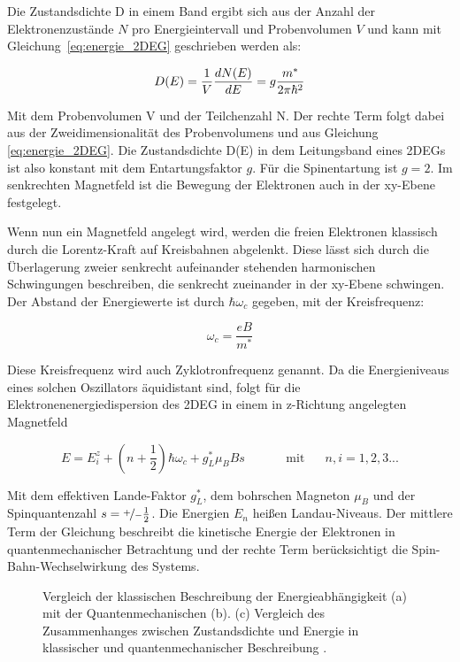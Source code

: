 Die Zustandsdichte D in einem Band ergibt sich aus der Anzahl der Elektronenzustände $N$ pro Energieintervall und Probenvolumen $V$ und kann mit Gleichung~\eqref{eq:energie_2DEG} geschrieben werden als:

\begin{equation}
	D(E)=\frac{1}{V}\frac{d N(E)}{d E}=g\frac{m^*}{2\pi\hbar^2}
	\label{eq:2DEG_zustandsdich} 
\end{equation}

Mit dem Probenvolumen V und der Teilchenzahl N. Der rechte Term folgt dabei aus der Zweidimensionalität des Probenvolumens und aus Gleichung \ref{eq:energie_2DEG}.
Die Zustandsdichte D(E) in dem Leitungsband eines 2DEGs ist also konstant mit dem Entartungsfaktor $g$. Für die Spinentartung ist $g=2$. Im senkrechten Magnetfeld ist die Bewegung der Elektronen auch in der xy-Ebene festgelegt.

Wenn nun ein Magnetfeld angelegt wird, werden die freien Elektronen klassisch durch die Lorentz-Kraft auf Kreisbahnen abgelenkt. Diese lässt sich durch die Überlagerung zweier senkrecht aufeinander stehenden harmonischen Schwingungen beschreiben, die senkrecht zueinander in der xy-Ebene schwingen. Der Abstand der Energiewerte ist durch $\hbar \omega_c$ gegeben,
mit der Kreisfrequenz:

\begin{equation}
\omega_c=\frac{eB}{m^*}
\label{eq:kreisfrequenz}
\end{equation}

Diese Kreisfrequenz wird auch Zyklotronfrequenz genannt. Da die Energieniveaus eines solchen Oszillators äquidistant sind, folgt für die Elektronenenergiedispersion des 2DEG in einem in z-Richtung angelegten Magnetfeld

\begin{equation}
E=E_i^z +(n+\frac{1}{2})\hbar\omega_c +g_L^*\mu_B Bs \text{~~~~~~~~~~mit~~~~~} n,i=1,2,3...
\label{eq:elektr_disp_bfeld}	
\end{equation}

Mit dem effektiven Lande-Faktor $g^*_L$, dem bohrschen Magneton $\mu_B$ und der Spinquantenzahl $s=\nicefrac{+}{-}\frac{1}{2}$.
Die Energien $E_n$ heißen Landau-Niveaus. Der mittlere Term der Gleichung beschreibt die kinetische Energie der Elektronen
in quantenmechanischer Betrachtung und der rechte Term berücksichtigt die Spin-Bahn-Wechselwirkung des Systems. 

\begin{figure}[h]
\centering
{}
\caption[Landau Niveaus]{Vergleich der klassischen Beschreibung der Energieabhängigkeit (a) mit der Quantenmechanischen (b). (c) Vergleich des Zusammenhanges zwischen Zustandsdichte und Energie in klassischer und quantenmechanischer Beschreibung \cite{anleitung}.}
\label{fig:Landauniveaus_Anleitungsheft}
\end{figure}

